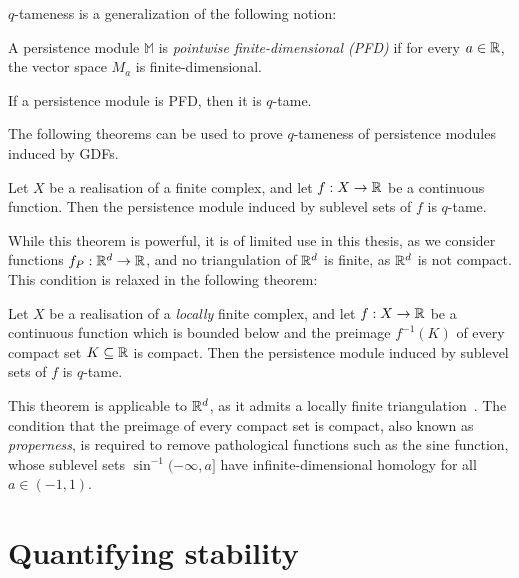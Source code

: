 $q$-tameness is a generalization of the following notion:
\begin{definition}
    A persistence module $\mathbb{M}$ is \emph{pointwise finite-dimensional
    (PFD)} if for every $a \in \mathbb{R}$, the vector space $M_a$ is
    finite-dimensional.
\end{definition}
\begin{lemma}
    \label{lem:tameness_pfd}
    If a persistence module is PFD, then it is $q$-tame.
\end{lemma}

The following theorems can be used to prove $q$-tameness of persistence modules
induced by GDFs.
\begin{theorem}
    Let $X$ be a realisation of a finite complex, and let $f : X \to \mathbb{R}$ be a
    continuous function. Then the persistence module induced by sublevel sets of
    $f$ is $q$-tame.
\end{theorem}
While this theorem is powerful, it is of limited use in this thesis, as we
consider functions $f_P : \mathbb{R}^d \to \mathbb{R}$, and no triangulation of $\mathbb{R}^d$ is
finite, as $\mathbb{R}^d$ is not compact. This condition is relaxed in the following
theorem:
\begin{theorem}
    \label{thm:tameness_condition}
    Let $X$ be a realisation of a \emph{locally} finite complex, and let
    $f : X \to \mathbb{R}$ be a continuous function which is bounded below and
    the preimage $f^{-1}(K)$ of every compact set $K \subseteq \mathbb{R}$ is compact.
    Then the persistence module induced by sublevel sets of $f$ is $q$-tame.
\end{theorem}
This theorem is applicable to $\mathbb{R}^d$, as it admits a locally finite
triangulation~\cite{grafakos2008classical}. The condition that the preimage of
every compact set is compact, also known as \emph{properness}, is required to
remove pathological functions such as the sine function, whose sublevel sets
$\sin^{-1}(-\infty, a]$ have infinite-dimensional homology for all $a \in (-1, 1)$.

\section{Quantifying stability}

